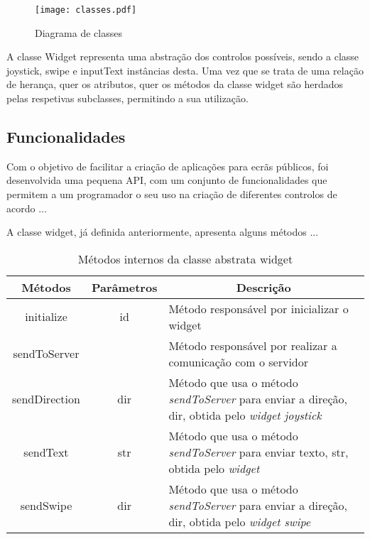 \begin{figure}[ht]
\centering
\texttt{[image: classes.pdf]}
\caption[\textit{classes}] {Diagrama de classes}
\label{fig:classes}
\end{figure}

A classe Widget representa uma abstração dos controlos possíveis, sendo a classe joystick, swipe e inputText instâncias desta. Uma vez que se trata de uma relação de herança, quer os atributos, quer os métodos da classe widget são herdados pelas respetivas subclasses, permitindo a sua utilização.

\subsection{Funcionalidades}

	Com o objetivo de facilitar a criação de aplicações para ecrãs públicos, foi desenvolvida uma pequena API, com um conjunto de funcionalidades que permitem a um programador o seu uso na criação de diferentes controlos de acordo ...

	A classe widget, já definida anteriormente, apresenta alguns métodos ...

	\begin{table}[ht]
 	\renewcommand{\arraystretch}{1.5}
	\centering

	\begin{tabular}{ p{2cm}|p{2cm}|p{10cm}  }
	\multicolumn{1}{c}{\textbf{Métodos}} & \multicolumn{1}{c}{\textbf{Parâmetros}} & \multicolumn{1}{c}{\textbf{Descrição}} \\
	\hline
	\multicolumn{1}{c}{initialize} & \multicolumn{1}{c}{id} &Método responsável por inicializar o widget \\
	\hline
	\multicolumn{1}{c}{sendToServer} & \multicolumn{1}{c}{} &Método responsável por realizar a comunicação com o servidor \\
	\hline
	\multicolumn{1}{c}{sendDirection} & \multicolumn{1}{c}{dir} &Método que usa o método \textit{sendToServer} para enviar a direção, dir, obtida pelo \textit{widget joystick} \\
	\hline
	\multicolumn{1}{c}{sendText} & \multicolumn{1}{c}{str} &Método que usa o método \textit{sendToServer} para enviar texto, str, obtida pelo \textit{widget}  \\
	\hline
	\multicolumn{1}{c}{sendSwipe} & \multicolumn{1}{c}{dir} &Método que usa o método \textit{sendToServer} para enviar a direção, dir, obtida pelo \textit{widget swipe}  \\
	\hline
	\end{tabular}
	\caption{Métodos internos da classe abstrata widget}
	\label{table:widget_met}
	\end{table}
	
